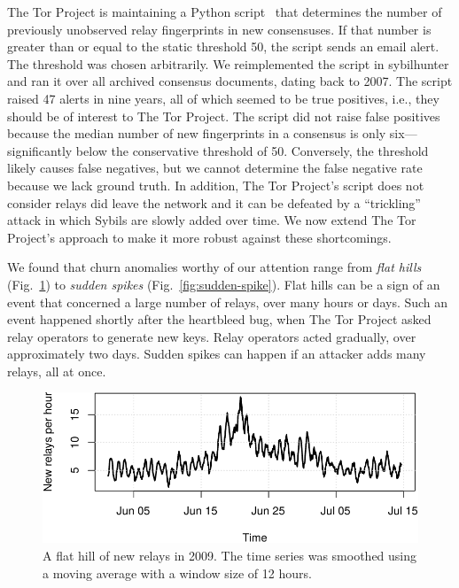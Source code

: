 The Tor Project is maintaining a Python script~\cite{doctor} that determines the
number of previously unobserved relay fingerprints in new consensuses.  If that
number is greater than or equal to the static threshold 50, the script sends an
email alert.  The threshold was chosen arbitrarily.  We reimplemented the script
in sybilhunter and ran it over all archived consensus documents, dating back to
2007.  The script raised 47 alerts in nine years, all of which seemed to be true
positives, i.e., they should be of interest to The Tor Project.  The script did
not raise false positives because the median number of new fingerprints in a
consensus is only six---significantly below the conservative threshold of 50.
Conversely, the threshold likely causes false negatives, but we cannot determine
the false negative rate because we lack ground truth.  In addition, The Tor
Project's script does not consider relays did leave the network and it can be
defeated by a ``trickling'' attack in which Sybils are slowly added over time.
We now extend The Tor Project's approach to make it more robust against these
shortcomings.

We found that churn anomalies worthy of our attention range from \emph{flat
hills} (Fig.~\ref{fig:flat-hill}) to \emph{sudden spikes}
(Fig.~\ref{fig:sudden-spike}).  Flat hills can be a sign of an event that
concerned a large number of relays, over many hours or days.  Such an event
happened shortly after the heartbleed bug, when The Tor Project asked relay
operators to generate new keys.  Relay operators acted gradually, over
approximately two days.  Sudden spikes can happen if an attacker adds many
relays, all at once.

\begin{figure}[t]
	\centering
	\includegraphics[width=\linewidth]{diagrams/flat-hill.pdf}
	\caption{A flat hill of new relays in 2009.  The time series was smoothed
	using a moving average with a window size of 12 hours.}
	\label{fig:flat-hill}
\end{figure}

